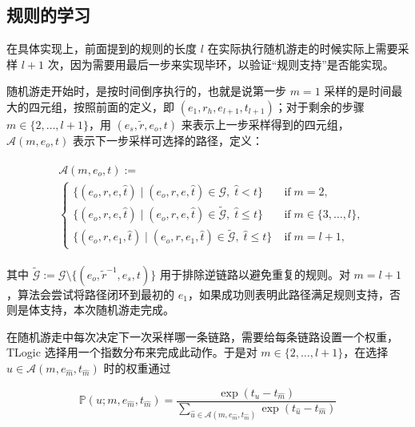 \documentclass[a4paper, AutoFakeBold]{article}
\begin{document}
\subsection{规则的学习}

在具体实现上，前面提到的规则的长度 $l$ 在实际执行随机游走的时候实际上需要采样 $l+1$ 次，因为需要用最后一步来实现毕环，以验证“规则支持”是否能实现。

随机游走开始时，是按时间倒序执行的，也就是说第一步 $m=1$ 采样的是时间最大的四元组，按照前面的定义，即 $(e_1,r_h,e_{l+1},t_{l+1})$；对于剩余的步骤 $m\in\{2,\dots,l+1\}$，用 $(e_s,{\tilde r},e_o,t)$ 来表示上一步采样得到的四元组，${\mathcal A}(m,e_o, t)$ 表示下一步采样可选择的路径，定义：

\begin{equation}
\begin{aligned}
	\begin{split}
		&\mathcal{A}(m, e_o, t) := \\
		&\begin{cases}
			\{(e_o, r, e, \hat{t}) \mid (e_o, r, e, \hat{t}) \in \mathcal{G},\; \hat{t} < t\} &\;\text{if}\; m = 2,\\
			\{(e_o, r, e, \hat{t}) \mid (e_o, r, e, \hat{t}) \in \tilde{\mathcal{G}},\; \hat{t} \leq t\} &\;\text{if}\; m \in \{3, \dots, l\},\\
			\{(e_o, r, e_1, \hat{t}) \mid (e_o, r, e_1, \hat{t}) \in \tilde{\mathcal{G}},\; \hat{t} \leq t\} &\;\text{if}\; m = l+1,
		\end{cases}
	\end{split}
\end{aligned}
\end{equation}

其中 $\tilde{\mathcal{G}} := \mathcal{G}\setminus \{(e_o, \tilde{r}^{-1}, e_s, t)\}$ 用于排除逆链路以避免重复的规则。对 $m=l+1$，算法会尝试将路径闭环到最初的 $e_1$，如果成功则表明此路径满足规则支持，否则是体支持，本次随机游走完成。

在随机游走中每次决定下一次采样哪一条链路，需要给每条链路设置一个权重，TLogic 选择用一个指数分布来完成此动作。于是对 $m \in \{2, \dots, l+1\}$，在选择 $u \in \mathcal{A}\left(m,e_{\hat{m}}, t_{\hat{m}}\right)$ 时的权重通过

\begin{equation}
	\mathbb{P}(u; m, e_{\hat{m}}, t_{\hat{m}}) = \frac{\exp(t_u - t_{\hat{m}})}{\sum\limits_{\hat{u} \in \mathcal{A}\left(m, e_{\hat{m}}, t_{\hat{m}}\right)}\exp(t_{\hat{u}} - t_{\hat{m}})}
\end{equation}
\end{document}
